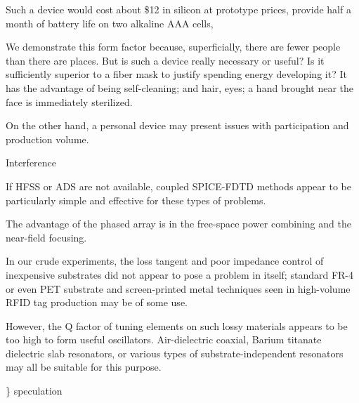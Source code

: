 \documentclass[paper.tex]{subfiles}
\begin{document}
Such a device would cost about \$12 in silicon at prototype prices, provide half a month of battery life on two alkaline AAA cells, 

We demonstrate this form factor because, superficially, there are fewer people than there are places. But is such a device really necessary or useful? Is it sufficiently superior to a fiber mask to justify spending energy developing it? It has the advantage of being self-cleaning; and hair, eyes; a hand brought near the face is immediately sterilized.


On the other hand, a personal device may present issues with participation and production volume. 

Interference

If HFSS or ADS are not available, coupled SPICE-FDTD methods appear to be particularly simple and effective for these types of problems.

The advantage of the phased array is in the free-space power combining and the near-field focusing.

In our crude experiments, the loss tangent and poor impedance control of inexpensive substrates did not appear to pose a problem in itself; standard FR-4 or even PET substrate and screen-printed metal techniques seen in high-volume RFID tag production may be of some use. 

However, the Q factor of tuning elements on such lossy materials appears to be too high to form useful oscillators. Air-dielectric coaxial, Barium titanate dielectric slab resonators, or various types of substrate-independent resonators may all be suitable for this purpose.

{\color{red} \} speculation } 
\end{document}
